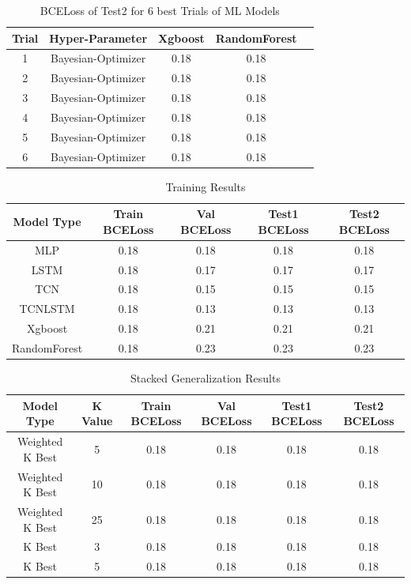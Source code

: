 \begin{table}[t]
\caption{BCELoss of Test2 for 6 best Trials of ML Models}
\vspace{0.1 in}
\centering
\resizebox{3.3in}{!}
{%
\begin{tabular}{|c|c|c|c|c|}
\hline
{\bf Trial} & {\bf Hyper-Parameter} & {\bf Xgboost} & {\bf RandomForest} \\  
\hline\hline
1  		&  Bayesian-Optimizer &  0.18 &  0.18   \\ 
2	  		&  Bayesian-Optimizer &  0.18 &  0.18   \\ 
3  		&  Bayesian-Optimizer &  0.18 &  0.18  \\ 
4	  		&  Bayesian-Optimizer &  0.18 &  0.18  \\ 
5	  		&  Bayesian-Optimizer &  0.18 &  0.18  \\ 
6	  		&  Bayesian-Optimizer &  0.18 &  0.18  \\ 
\hline
\end{tabular}
}
\label{tab:mlmodels}
\end{table}


\begin{table}[t]
\caption{ Training Results}
\vspace{0.1 in}
\centering
\resizebox{3.3in}{!}
{%
\begin{tabular}{|c|c|c|c|c|}
\hline
{\bf Model Type} & {\bf Train BCELoss} & {\bf Val BCELoss} & {\bf Test1 BCELoss} & {\bf Test2 BCELoss} \\ 
\hline\hline 
MLP	  		&  0.18 &  0.18 &  0.18 &  0.18  \\ \hline
LSTM  		&  0.18 &  0.17 &  0.17 &  0.17 \\ \hline
TCN			&  0.18 &  0.15  &  0.15 &  0.15  \\ \hline
TCNLSTM 	&  0.18 & 0.13  & 0.13	& 0.13	 \\ \hline
Xgboost 	&  0.18 & 0.21 & 0.21	& 0.21	\\ \hline
RandomForest &  0.18 & 0.23 & 0.23	& 0.23	\\ \hline
\end{tabular}
}
\label{tab:training}
\end{table}


\begin{table}[t]
\caption{ Stacked Generalization Results}
\vspace{0.1 in}
\centering
\resizebox{3.3in}{!}
{%
\begin{tabular}{|c|c|c|c|c|c|}
\hline
{\bf Model Type} & {\bf K Value} & {\bf Train BCELoss} & {\bf Val BCELoss} & {\bf Test1 BCELoss} & {\bf Test2 BCELoss} \\ 
\hline\hline 
Weighted K Best	  		&  5 &  0.18  &  0.18 &  0.18 &  0.18  \\ \hline
Weighted K Best	  		&  10 &  0.18  &  0.18 &  0.18 &  0.18  \\ \hline
Weighted K Best	  		&  25 &  0.18  &  0.18 &  0.18 &  0.18  \\ \hline
K Best	  		&  3 &   0.18 & 0.18 &  0.18 &  0.18  \\ \hline
K Best	  		&  5 &  0.18  &  0.18 &  0.18 &  0.18  \\ \hline
\end{tabular}
}
\label{tab:stacking}
\end{table}

